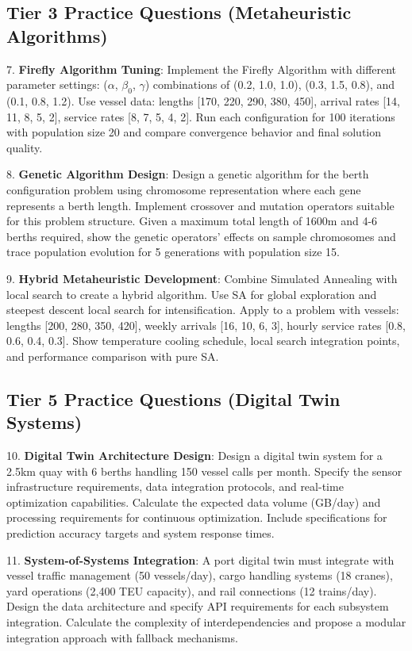 \documentclass{article}
\begin{document}
\subsection{Tier 3 Practice Questions (Metaheuristic Algorithms)}

7. \textbf{Firefly Algorithm Tuning}: Implement the Firefly Algorithm with different parameter settings: ($\alpha$, $\beta_0$, $\gamma$) combinations of (0.2, 1.0, 1.0), (0.3, 1.5, 0.8), and (0.1, 0.8, 1.2). Use vessel data: lengths [170, 220, 290, 380, 450], arrival rates [14, 11, 8, 5, 2], service rates [8, 7, 5, 4, 2]. Run each configuration for 100 iterations with population size 20 and compare convergence behavior and final solution quality.

8. \textbf{Genetic Algorithm Design}: Design a genetic algorithm for the berth configuration problem using chromosome representation where each gene represents a berth length. Implement crossover and mutation operators suitable for this problem structure. Given a maximum total length of 1600m and 4-6 berths required, show the genetic operators' effects on sample chromosomes and trace population evolution for 5 generations with population size 15.

9. \textbf{Hybrid Metaheuristic Development}: Combine Simulated Annealing with local search to create a hybrid algorithm. Use SA for global exploration and steepest descent local search for intensification. Apply to a problem with vessels: lengths [200, 280, 350, 420], weekly arrivals [16, 10, 6, 3], hourly service rates [0.8, 0.6, 0.4, 0.3]. Show temperature cooling schedule, local search integration points, and performance comparison with pure SA.

\subsection{Tier 5 Practice Questions (Digital Twin Systems)}

10. \textbf{Digital Twin Architecture Design}: Design a digital twin system for a 2.5km quay with 6 berths handling 150 vessel calls per month. Specify the sensor infrastructure requirements, data integration protocols, and real-time optimization capabilities. Calculate the expected data volume (GB/day) and processing requirements for continuous optimization. Include specifications for prediction accuracy targets and system response times.

11. \textbf{System-of-Systems Integration}: A port digital twin must integrate with vessel traffic management (50 vessels/day), cargo handling systems (18 cranes), yard operations (2,400 TEU capacity), and rail connections (12 trains/day). Design the data architecture and specify API requirements for each subsystem integration. Calculate the complexity of interdependencies and propose a modular integration approach with fallback mechanisms.
\end{document}
